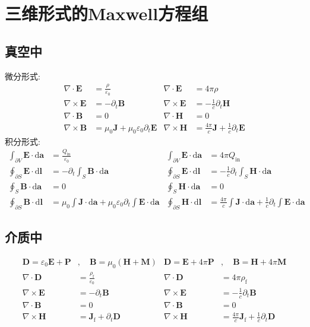 \documentclass{article}
\newcommand\del{\partial}
\newcommand\bo[1]{\boldsymbol{#1}}
\renewcommand\d{\mathrm{d}}
\begin{document}
\section{三维形式的Maxwell方程组}

\subsection{真空中}
微分形式:
\begin{align*}
\nabla\cdot\bo E&=\frac{\rho}{\varepsilon_{0}}&\nabla\cdot\bo E&=4\pi\rho\\
\nabla\times\bo E&=-\del_t\bo B&\nabla\times\bo E&=-\frac{1}{c}\del_t\bo H\\
\nabla\cdot\bo B&=0&\nabla\cdot\bo H&=0\\
\nabla\times\bo B&=\mu_0\bo J+\mu_0\varepsilon_0\del_t\bo E&\nabla\times\bo H&=\frac{4\pi}{c}\bo J+\frac{1}{c}\del_t\bo E
\end{align*}
积分形式:
\begin{align*}
\int_{\del V}\bo E\cdot\d\bo a&=\frac{Q_{\mathrm{in}}}{\varepsilon_{0}}&\int_{\del V}\bo E\cdot\d\bo a&=4\pi Q_{\mathrm{in}}\\
\oint_{\del S}\bo E\cdot\d\bo l&=-\del_t\int_S\bo B\cdot\d\bo a&\oint_{\del S}\bo E\cdot\d\bo l&=-\frac{1}{c}\del_t\int_S\bo H\cdot\d\bo a\\
\oint_S\bo B\cdot\d\bo a&=0&\oint_S\bo H\cdot\d\bo a&=0\\
\oint_{\del S}\bo B\cdot\d\bo l&=\mu_0\int\bo J\cdot\d\bo a+\mu_0\varepsilon_0\del_t\int\bo E\cdot\d\bo a&\oint_{\del S}\bo H\cdot\d\bo l&=\frac{4\pi}{c}\int\bo J\cdot\d\bo a+\frac{1}{c}\del_t\int\bo E\cdot\d\bo a&
\end{align*}

\subsection{介质中}
\vspace*{-2em}
\begin{align*}
\bo D=\varepsilon_{0}\bo E+\bo P&,\quad \bo B=\mu_0(\bo H+\bo M)&\bo D=\bo E+4\pi\bo P&,\quad \bo B=\bo H+4\pi\bo M\\
\nabla\cdot\bo D&=\frac{\rho_\mathrm{f}}{\varepsilon_{0}}&\nabla\cdot\bo D&=4\pi\rho_\mathrm{f}\\
\nabla\times\bo E&=-\del_t\bo B&\nabla\times\bo E&=-\frac1c\del_t\bo B\\
\nabla\cdot\bo B&=0&\nabla\cdot\bo B&=0\\
\nabla\times\bo H&=\bo J_\mathrm{f}+\del_t\bo D&\nabla\times\bo H&=\frac{4\pi}{c}\bo J_\mathrm{f}+\frac1c\del_t\bo D
\end{align*}
\end{document}
